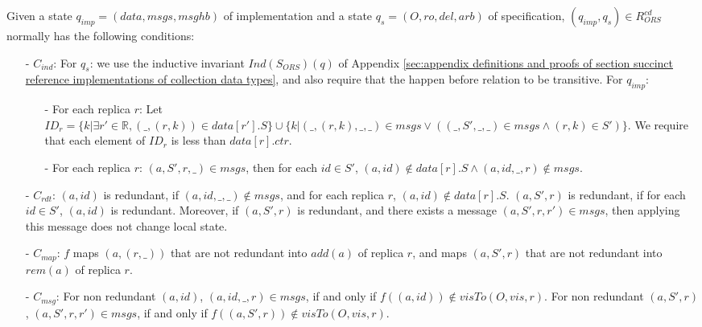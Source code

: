Given a state $q_{\mathit{imp}} = (\mathit{data},\mathit{msgs},\mathit{msghb})$ of implementation and a state $q_s = (O,\mathit{ro},\mathit{del},\mathit{arb})$ of specification, $(q_{\mathit{imp}},q_s) \in R_{\mathit{ORS}}^{\mathit{cd}}$ normally has the following conditions:

\begin{itemize}
\setlength{\itemsep}{0.5pt}
\item[-] $C_{\mathit{ind}}$: For $q_s$: we use the inductive invariant $\mathit{Ind}(S_{\mathit{ORS}})(q)$ of Appendix \ref{sec:appendix definitions and proofs of section succinct reference implementations of collection data types}, and also require that the happen before relation to be transitive. For $q_{\mathit{imp}}$:

    \begin{itemize}
    \setlength{\itemsep}{0.5pt}
    \item[-] For each replica $r$: Let $\mathit{ID}_r = \{ k \vert \exists r' \in \mathbb{R}, (\_,(r,k)) \in \mathit{data}[r'].S \} \cup \{ k \vert (\_,(r,k),\_,\_) \in \mathit{msgs} \vee ( (\_,S',\_,\_) \in \mathit{msgs} \wedge (r,k) \in S' ) \}$. We require that each element of $\mathit{ID}_r$ is less than $\mathit{data}[r].\mathit{ctr}$.

    \item[-] For each replica $r$: $(a,S',r,\_) \in \mathit{msgs}$, then for each $\mathit{id} \in S'$, $(a,\mathit{id}) \notin \mathit{data}[r].S \wedge (a,\mathit{id},\_,r) \notin \mathit{msgs}$.
    \end{itemize}

\item[-] $C_{\mathit{rdt}}$: $(a,\mathit{id})$ is redundant, if $(a,\mathit{id},\_,\_) \notin \mathit{msgs}$, and for each replica $r$, $(a,\mathit{id}) \notin \mathit{data}[r].S$. $(a,S',r)$ is redundant, if for each $\mathit{id} \in S'$, $(a,\mathit{id})$ is redundant. Moreover, if $(a,S',r)$ is redundant, and there exists a message $(a,S',r,r') \in \mathit{msgs}$, then applying this message does not change local state.

\item[-] $C_{\mathit{map}}$: $f$ maps $(a,(r,\_))$ that are not redundant into $\mathit{add}(a)$ of replica $r$, and maps $(a,S',r)$ that are not redundant into $\mathit{rem}(a)$ of replica $r$.

\item[-] $C_{\mathit{msg}}$: For non redundant $(a,\mathit{id})$, $(a,\mathit{id},\_,r) \in \mathit{msgs}$, if and only if $f((a,\mathit{id})) \notin \mathit{visTo}(O,\mathit{vis},r)$. For non redundant $(a,S',r)$, $(a,S',r,r') \in \mathit{msgs}$, if and only if $f((a,S',r)) \notin \mathit{visTo}(O,\mathit{vis},r)$.


\end{itemize}
